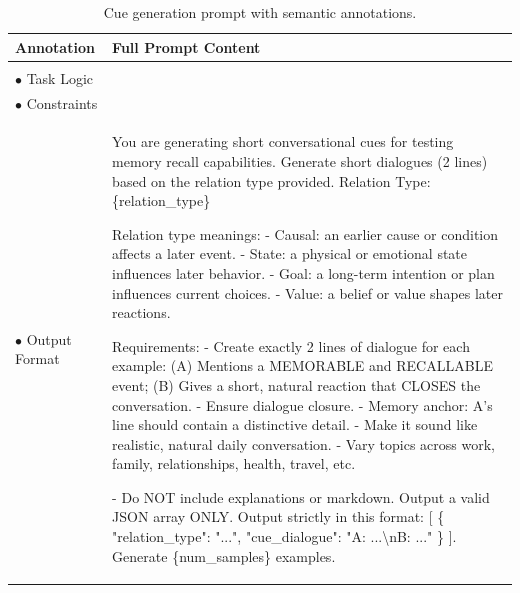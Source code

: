 \documentclass[11pt]{article}
\begin{document}
\begin{table}[t]
\centering
\small
\renewcommand{\arraystretch}{1.5}
\begin{tabularx}{\textwidth}{l | X}
\toprule
\textbf{Annotation} & \textbf{Full Prompt Content} \\ \midrule

\begin{tabular}[t]{@{}l@{}}
    \textcolor{cRole}{$\bullet$ Role Setting} \\
    \textcolor{cLogic}{$\bullet$ Task Logic} \\
    \textcolor{cReq}{$\bullet$ Constraints} \\
    \textcolor{cFormat}{$\bullet$ Output Format}
\end{tabular} & 
\textcolor{cRole}{You are generating short conversational cues for testing memory recall capabilities. Generate short dialogues (2 lines) based on the relation type provided. Relation Type: \{relation\_type\}} 

\textcolor{cLogic}{Relation type meanings: - Causal: an earlier cause or condition affects a later event. - State: a physical or emotional state influences later behavior. - Goal: a long-term intention or plan influences current choices. - Value: a belief or value shapes later reactions.}

\textcolor{cReq}{Requirements: - Create exactly 2 lines of dialogue for each example: (A) Mentions a MEMORABLE and RECALLABLE event; (B) Gives a short, natural reaction that CLOSES the conversation. - Ensure dialogue closure. - Memory anchor: A's line should contain a distinctive detail. - Make it sound like realistic, natural daily conversation. - Vary topics across work, family, relationships, health, travel, etc.}

\textcolor{cFormat}{- Do NOT include explanations or markdown. Output a valid JSON array ONLY. Output strictly in this format: [ \{ "relation\_type": "...", "cue\_dialogue": "A: ...\textbackslash nB: ..." \} ]. Generate \{num\_samples\} examples.} \\ 

\bottomrule
\end{tabularx}
\caption{Cue generation prompt with semantic annotations.}
\label{tab:cue_prompt}
\end{table}
\end{document}
